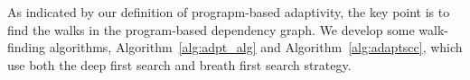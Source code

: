 As indicated by our definition of prograpm-based adaptivity, the key point is to find the walks in the program-based dependency graph. We develop some walk-finding algorithms,  Algorithm~\ref{alg:adpt_alg} and Algorithm~\ref{alg:adaptscc}, which use both the deep first search and breath first search strategy.  

